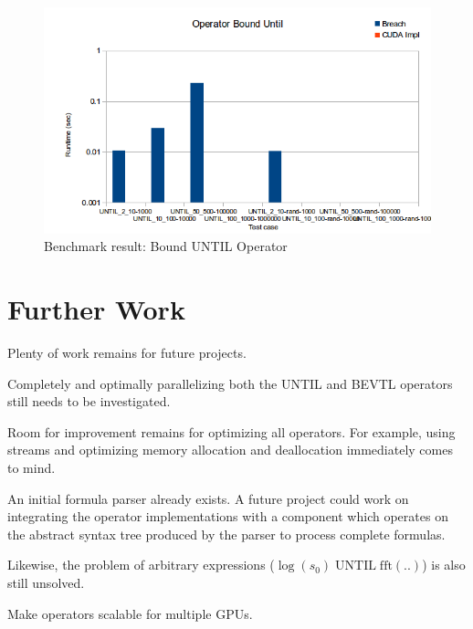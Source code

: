 \documentclass[a4paper,10pt]{article}
\begin{document}
\begin{figure}[H]
    \includegraphics[scale=0.5]{bm_buntil.png}
    \caption{
        \label{fig:bm_buntil}
        Benchmark result: Bound UNTIL Operator}
\end{figure}



\section{Further Work}

Plenty of work remains for future projects.

Completely and optimally parallelizing both the UNTIL and BEVTL operators still needs
to be investigated.

Room for improvement remains for optimizing all operators. For example, using streams
and optimizing memory allocation and deallocation immediately comes to mind.

An initial formula parser already exists. A future project could work on integrating the operator implementations with a component which operates on the abstract syntax tree produced by the parser to process complete formulas.

Likewise, the problem of arbitrary expressions ($\log(s_0) \; \text{UNTIL} \; \text{fft}(..)$) is also still unsolved.

Make operators scalable for multiple GPUs.
\end{document}
